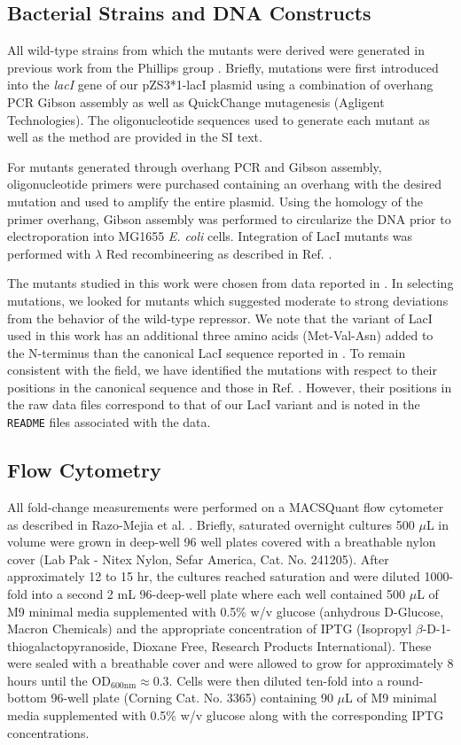 \subsection{Bacterial Strains and DNA Constructs}
All wild-type strains from which the mutants were derived were generated in
previous work from the Phillips group \cite{Garcia2011, Razo-Mejia2018}.
Briefly, mutations were first introduced into the \textit{lacI} gene of our
pZS3*1-lacI plasmid \cite{Garcia2011} using a combination of overhang PCR
Gibson assembly as well as QuickChange mutagenesis (Agligent Technologies).
The oligonucleotide sequences used to generate each mutant as well as the
method are provided in the SI text.

For mutants generated through overhang PCR and Gibson assembly,
oligonucleotide primers were purchased containing an overhang with the
desired mutation and used to amplify the entire plasmid. Using the homology
of the primer overhang, Gibson assembly was performed to circularize the DNA
prior to electroporation into MG1655 \textit{E. coli} cells. Integration of LacI
mutants was performed with $\lambda$ Red recombineering \cite{Sharan2009}
as described in Ref. \cite{Sharan2009, Garcia2011}.

The mutants studied in this work were chosen from data reported in
\cite{Daber2011a}. In selecting mutations, we looked for mutants which suggested
moderate to strong deviations from the behavior of the wild-type repressor. We
note that the variant of LacI used in this work has an additional three amino
acids (Met-Val-Asn) added to the N-terminus than the canonical LacI sequence
reported in \cite{Farabaugh1978}. To remain consistent with the field, we have
identified the mutations with respect to their positions in the canonical
sequence and those in Ref. 
\cite{Daber2011a}. However, their positions in the raw data files correspond to
that of our LacI variant and is noted in the \texttt{README} files associated
with the data. 

\subsection{Flow Cytometry}    
All fold-change measurements were performed on a MACSQuant flow cytometer as
described in Razo-Mejia et al. \cite{Razo-Mejia2018}. Briefly, saturated
overnight cultures 500 $\mu$L in volume were grown in deep-well 96 well plates 
covered with  a breathable nylon cover (Lab Pak - Nitex
Nylon, Sefar America, Cat. No. 241205). After approximately 12 to 15 hr, the
cultures reached saturation and were diluted 1000-fold into a second 2 mL
96-deep-well plate where each well contained 500 $\mu$L of M9 minimal media
supplemented with 0.5\% w/v glucose (anhydrous D-Glucose, Macron Chemicals)
and the appropriate concentration of IPTG (Isopropyl
$\beta$-D-1-thiogalactopyranoside, Dioxane Free, Research Products International).
These were sealed with a breathable cover and were allowed to grow for
approximately 8 hours until the OD$_\text{600nm} \approx 0.3$. 
Cells were then diluted ten-fold into a round-bottom 96-well plate 
(Corning Cat. No. 3365) containing 90 $\mu$L of M9 minimal media supplemented 
with 0.5\% w/v glucose along with the corresponding IPTG concentrations.

